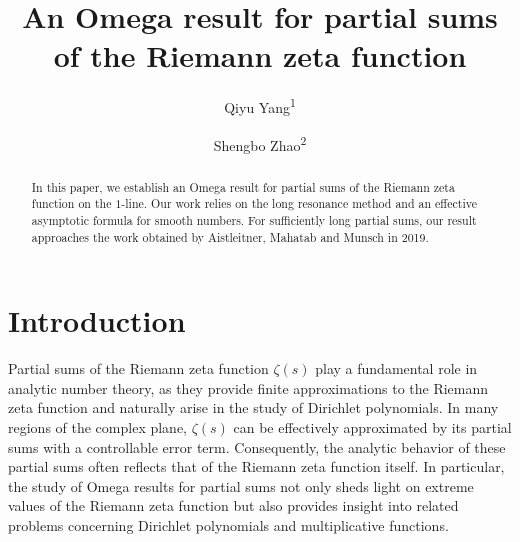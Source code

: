 \documentclass[12pt,reqno]{amsart}
\theoremstyle{definition}
\numberwithin{equation}{section}
\begin{document}
	
	
	\baselineskip=17pt
	
	
	\title[An Omega result for partial sums of the Riemann zeta function]{An Omega result for partial sums of the Riemann zeta function}
	
	
	\author{Qiyu Yang\textsuperscript{1}}
    \author{Shengbo Zhao\textsuperscript{2}}
	\address{1. School of Mathematics and Statistics, Henan Normal University, Xinxiang 453007, CHINA}
	\address{2. School of Mathematical Sciences, Key Laboratory of Intelligent Computing and Applications (Tongji University), Ministry of Education, Tongji University, Shanghai 200092, China}

	
	\begin{abstract} 
	   In this paper, we establish an Omega result for partial sums of the Riemann zeta function on the \(1\)-line. Our work relies on the long resonance method and an effective asymptotic formula for smooth numbers. For sufficiently long partial sums, our result approaches the work obtained by Aistleitner, Mahatab and Munsch in 2019.
	\end{abstract}
	
	
	
	\maketitle

\section{Introduction}

Partial sums of the Riemann zeta function \(\zeta(s)\) play a fundamental role in analytic number theory, as they provide finite approximations to the Riemann zeta function and naturally arise in the study of Dirichlet polynomials. In many regions of the complex plane, \(\zeta(s)\) can be effectively approximated by its partial sums with a controllable error term. Consequently, the analytic behavior of these partial sums often reflects that of the Riemann zeta function itself. In particular, the study of Omega results for partial sums not only sheds light on extreme values of the Riemann zeta function but also provides insight into related problems concerning Dirichlet polynomials and multiplicative functions. 
\end{document}

